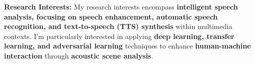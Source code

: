  \small{ \textbf{Research Interests: } My research interests encompass \textbf{intelligent speech analysis, focusing on speech enhancement, automatic speech recognition, and text-to-speech (TTS) synthesis} within multimedia contexts. I'm particularly interested in applying \textbf{deep learning, transfer learning, and adversarial learning} techniques to enhance \textbf{human-machine interaction} through \textbf{acoustic scene analysis}.}

